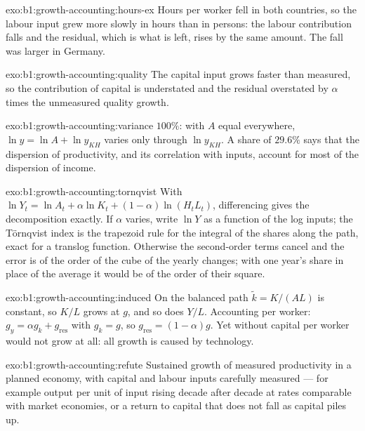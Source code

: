\begin{solution}{exo:b1:growth-accounting:hours-ex}
Hours per worker fell in both countries, so the labour input grew more
slowly in hours than in persons: the labour contribution falls and the
residual, which is what is left, rises by the same amount. The fall was
larger in Germany.
\end{solution}

\begin{solution}{exo:b1:growth-accounting:quality}
The capital input grows faster than measured, so the contribution of
capital is understated and the residual overstated by $\alpha$ times the
unmeasured quality growth.
\end{solution}

\begin{solution}{exo:b1:growth-accounting:variance}
$100\%$: with $A$ equal everywhere, $\ln y = \ln A + \ln y_{KH}$ varies only through $\ln y_{KH}$. A
share of $29.6\%$ says that the dispersion of productivity, and its
correlation with inputs, account for most of the dispersion of income.
\end{solution}

\begin{solution}{exo:b1:growth-accounting:tornqvist}
With $\ln Y_t = \ln A_t + \alpha \ln K_t + (1 - \alpha)\ln(H_tL_t)$, differencing gives the decomposition
exactly. If $\alpha$ varies, write $\ln Y$ as a function of the log inputs; the
Törnqvist index is the trapezoid rule for the integral of the shares along
the path, exact for a translog function. Otherwise the second-order terms
cancel and the error is of the order of the cube of the yearly changes;
with one year's share in place of the average it would be of the order of
their square.
\end{solution}

\begin{solution}{exo:b1:growth-accounting:induced}
On the balanced path $\tilde k = K/(AL)$ is constant, so $K/L$ grows at $g$, and so does
$Y/L$. Accounting per worker: $g_y = \alpha g_k + g_{\text{res}}$ with $g_k = g$, so $g_{\text{res}} = (1 - \alpha)g$.
Yet without  capital per worker would not grow at all:
all growth is caused by technology.
\end{solution}

\begin{solution}{exo:b1:growth-accounting:refute}
Sustained growth of measured productivity in a planned economy, with
capital and labour inputs carefully measured --- for example output per
unit of input rising decade after decade at rates comparable with market
economies, or a return to capital that does not fall as capital piles up.
\end{solution}

